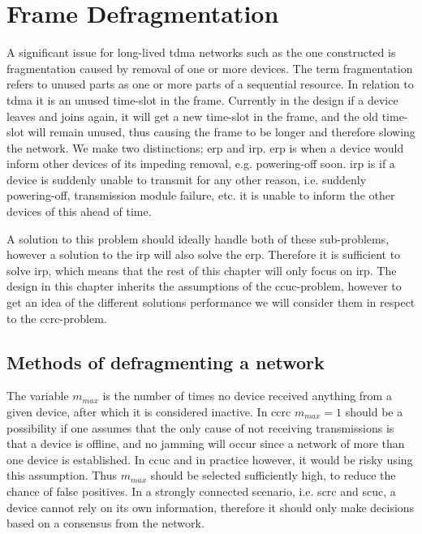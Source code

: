\section{Frame Defragmentation}
A significant issue for long-lived \gls{tdma} networks such as the one constructed is fragmentation caused by removal of one or more devices. 
The term fragmentation refers to unused parts as one or more parts of a sequential resource. 
In relation to \gls{tdma} it is an unused time-slot in the frame. 
Currently in the design if a device leaves and joins again, it will get a new time-slot in the frame, and the old time-slot will remain unused, thus causing the frame to be longer and therefore slowing the network.
We make two distinctions; \gls{erp} and \gls{irp}.
\gls{erp} is when a device would inform other devices of its impeding removal, e.g. powering-off soon. 
\gls{irp} is if a device is suddenly unable to transmit for any other reason, i.e. suddenly powering-off, transmission module failure, etc. it is unable to inform the other devices of this ahead of time. 

A solution to this problem should ideally handle both of these sub-problems, however a solution to the \gls{irp} will also solve the \gls{erp}.
Therefore it is sufficient to solve \gls{irp}, which means that the rest of this chapter will only focus on \gls{irp}.  
The design in this chapter inherits the assumptions of the \gls{ccuc}-problem, however to get an idea of the different solutions performance we will consider them in respect to the \gls{ccrc}-problem. 

\subsection{Methods of defragmenting a network}

The variable $m_{max}$ is the number of times no device received anything from a given device, after which it is considered inactive. 
In \gls{ccrc} $m_{max} = 1$ should be a possibility if one assumes that the only cause of not receiving transmissions is that a device is offline, and no jamming will occur since a network of more than one device is established.
In \gls{ccuc} and in practice however, it would be risky using this assumption.
Thus $m_{max}$ should be selected sufficiently high, to reduce the chance of false positives. 
In a strongly connected scenario, i.e. \gls{scrc} and \gls{scuc}, a device cannot rely on its own information, therefore it should only make decisions based on a consensus from the network. 

